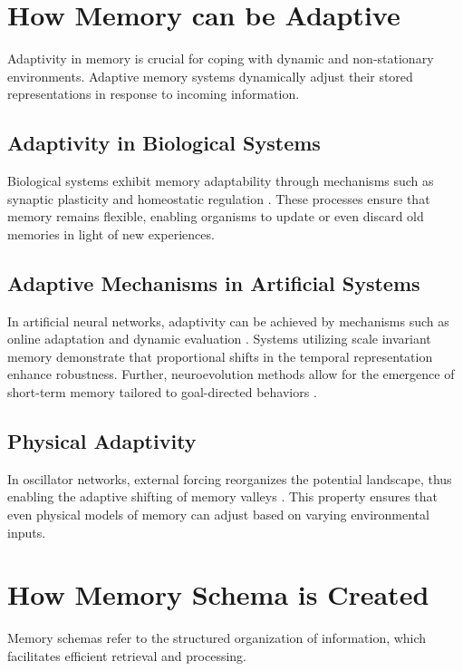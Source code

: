 \documentclass{article}
\begin{document}
\section{How Memory can be Adaptive}
\label{sec:adaptive}
Adaptivity in memory is crucial for coping with dynamic and non-stationary environments. Adaptive memory systems dynamically adjust their stored representations in response to incoming information.

\subsection{Adaptivity in Biological Systems}
Biological systems exhibit memory adaptability through mechanisms such as synaptic plasticity and homeostatic regulation \parencite{wakeling2004adaptivityperlearning, jitsev2010experiencedrivenformationpartsbasedrepresentations}. These processes ensure that memory remains flexible, enabling organisms to update or even discard old memories in light of new experiences.

\subsection{Adaptive Mechanisms in Artificial Systems}
In artificial neural networks, adaptivity can be achieved by mechanisms such as online adaptation and dynamic evaluation \parencite{rannentriki2024revisitingdynamicevaluationonline}. Systems utilizing scale invariant memory \parencite{kabir2024deepreinforcementlearningtimescale} demonstrate that proportional shifts in the temporal representation enhance robustness. Further, neuroevolution methods allow for the emergence of short-term memory tailored to goal-directed behaviors \parencite{lakhman2012neuroevolutionresultsemergenceshortterm}.

\subsection{Physical Adaptivity}
In oscillator networks, external forcing reorganizes the potential landscape, thus enabling the adaptive shifting of memory valleys \parencite{hoppensteadt2020frequencyphasepotentialforcedstno}. This property ensures that even physical models of memory can adjust based on varying environmental inputs.

\section{How Memory Schema is Created}
\label{sec:schema}
Memory schemas refer to the structured organization of information, which facilitates efficient retrieval and processing.
\end{document}
